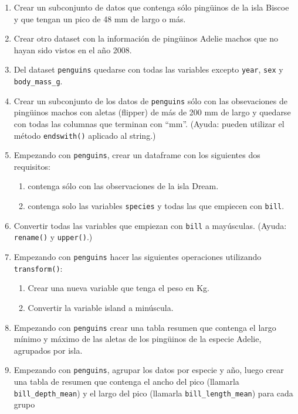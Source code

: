 \documentclass[a4paper,11pt]{article}
\theoremstyle{definition}
\begin{document}
\begin{enumerate}

\item Crear un subconjunto de datos que contenga sólo ping\"uinos de la isla Biscoe y que tengan un pico de 48 mm de largo o más.
\item Crear otro dataset con la información de ping\"uinos Adelie machos que no hayan sido vistos en el año 2008.
\item Del dataset \lstinline{penguins} quedarse con todas las variables excepto \lstinline{year}, \lstinline{sex} y \lstinline{body_mass_g}.
\item Crear un subconjunto de los datos de \lstinline{penguins} sólo con las obsevaciones de ping\"uinos machos con aletas (flipper) de más de 200 mm de largo y quedarse con todas las columnas que terminan con “mm”. (Ayuda: pueden utilizar el método \lstinline{endswith()} aplicado al string.)


\item Empezando con \lstinline{penguins}, crear un dataframe con los siguientes dos requisitos:
\begin{enumerate}
\item contenga sólo con las observaciones de la isla Dream.
\item contenga solo las variables \lstinline{species} y todas las que empiecen con \lstinline{bill}.
\end{enumerate}

\item Convertir todas las variables que empiezan con \lstinline{bill} a mayúsculas. (Ayuda: \lstinline{rename()} y \lstinline{upper()}.)

\item Empezando con \lstinline{penguins} hacer las siguientes operaciones utilizando \lstinline{transform()}:
\begin{enumerate}
\item Crear una nueva variable que tenga el peso en Kg.
\item Convertir la variable island a minúscula.
\end{enumerate}

\item Empezando con \lstinline{penguins} crear una tabla resumen que contenga el largo mínimo y máximo de las aletas de los ping\"uinos de la especie Adelie, agrupados por isla.

\item Empezando con \lstinline{penguins}, agrupar los datos por especie y año, luego crear una tabla de resumen que contenga el ancho del pico (llamarla \lstinline{bill_depth_mean}) y el largo del pico (llamarla \lstinline{bill_length_mean}) para cada grupo


\end{enumerate}
\end{document}
